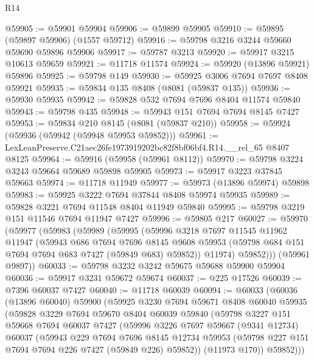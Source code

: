 \begin{lexlean}{R14}
\begin{coremodule}
@59905 := @59901 @59904
@59906 := @59899 @59905
@59910 := @59895 (@59897 @59906) (@1557 @59712)
@59916 := @59798 @3216 @3244 @59660 @59690 @59896 @59906
@59917 := @59787 @3213
@59920 := @59917 @3215 @10613 @59659
@59921 := @11718 @11574
@59924 := @59920 (@13896 @59921) @59896
@59925 := @59798 @149
@59930 := @59925 @3006 @7694 @7697 @8408 @59921
@59935 := @59834 @135 @8408 (@8081 (@59837 @135))
@59936 := @59930 @59935
@59942 := @59828 @532 @7694 @7696 @8404 @11574 @59840
@59943 := @59798 @435
@59948 := @59943 @151 @7694 @7694 @8145 @7427
@59953 := @59834 @210 @8145 (@8081 (@59837 @210))
@59958 := @59924 (@59936 (@59942 (@59948 @59953 @59852)))
@59961 := LexLeanPreserve.C21aec26fe1973919202bc82f8bf06bf4.R14.__rel_65 @8407 @8125
@59964 := @59916 (@59958 (@59961 @8112))
@59970 := @59798 @3224 @3243 @59664 @59689 @59898 @59905
@59973 := @59917 @3223 @37845 @59663
@59974 := @11718 @11949
@59977 := @59973 (@13896 @59974) @59898
@59983 := @59925 @3222 @7694 @37844 @8408 @59974 @59935
@59989 := @59828 @3221 @7694 @11548 @8404 @11949 @59840
@59995 := @59798 @3219 @151 @11546 @7694 @11947 @7427
@59996 := @59805 @217
@60027 := @59970
    (@59977
      (@59983
        (@59989
          (@59995
            (@59996
              @3218
              @7697
              @11545
              @11962
              @11947
              (@59943
                @686
                @7694
                @7696
                @8145
                @9608
                @59953
                (@59798 @684 @151 @7694 @7694 @683 @7427 (@59849 @683) @59852))
              @11974)
            @59852)))
      (@59961 @9897))
@60033 := @59798 @3232 @3242 @59675 @59688 @59900 @59904
@60036 := @59917 @3231 @59672 @59674
@60037 := @225 @17526
@60039 := @7396 @60037 @7427
@60040 := @11718 @60039
@60094 := @60033
    (@60036
      (@13896 @60040)
      @59900
      (@59925
        @3230
        @7694
        @59671
        @8408
        @60040
        @59935
        (@59828
          @3229
          @7694
          @59670
          @8404
          @60039
          @59840
          (@59798
            @3227
            @151
            @59668
            @7694
            @60037
            @7427
            (@59996
              @3226
              @7697
              @59667
              (@9341 @12734)
              @60037
              (@59943
                @229
                @7694
                @7696
                @8145
                @12734
                @59953
                (@59798 @227 @151 @7694 @7694 @226 @7427 (@59849 @226) @59852))
              (@11973 @170))
            @59852)))

\end{coremodule}
\end{lexlean}
